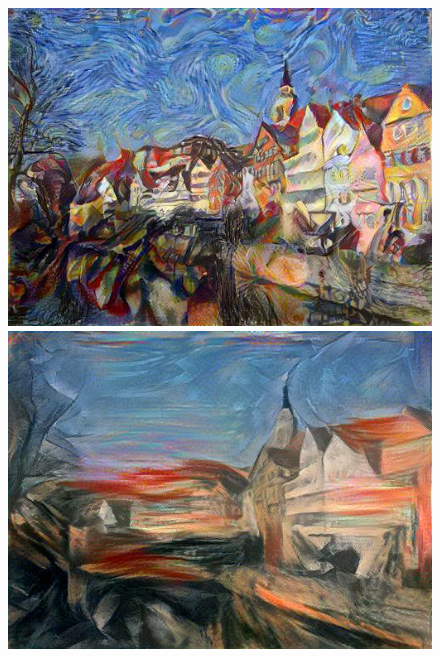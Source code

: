 \documentclass[runningheads]{llncs}
\begin{document}
\begin{figure}[h!]
{\begin{minipage}[b]{0.15\textwidth}
\includegraphics[width=1\textwidth]{neural_style_transfer/img/05_multi_style_output/multi_styles_0-5.jpg} \\
\includegraphics[width=1\textwidth]{neural_style_transfer/img/05_multi_style_output/multi_styles1_0-5.jpg}
\end{minipage}
}
\end{figure}
\end{document}
